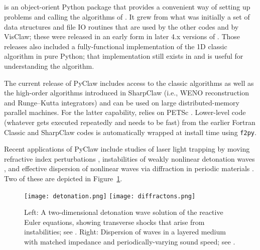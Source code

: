 %
%
%

\subsection{\pyclaw} \label{sec:pyclaw}
\pyclaw is an object-orient Python package that provides a convenient way
of setting up problems and calling the algorithms of \clawpack.  It grew
from what was initially a set of data structures and file IO routines that are
used by the other \clawpack codes and by VisClaw; these were released in
an early form in later 4.x versions of \clawpack.  Those releases also
included a fully-functional implementation of the 1D classic algorithm
in pure Python; that implementation still exists in \pyclaw and is useful
for understanding the algorithm.

The current release of PyClaw includes access to the classic algorithms as well
as the high-order algorithms introduced in SharpClaw \cite{2013_sharpclaw} (i.e., WENO
reconstruction and Runge--Kutta integrators) and can be used on large
distributed-memory parallel machines.  For the latter capability, \pyclaw
relies on PETSc \cite{petsc-user-ref}.
Lower-level code (whatever gets executed
repeatedly and needs to be fast) from the earlier Fortran Classic and SharpClaw
codes is automatically wrapped at install time using \texttt{f2py}.

Recent applications of PyClaw include studies of laser light trapping by moving
refractive index perturbations \cite{sanroman_thesis}, instabilities of weakly nonlinear detonation
waves \cite{faria2015qualitative}, and effective dispersion of nonlinear waves via diffraction in
periodic materials \cite{2015_diffractons}.  Two of these are depicted in 
Figure~\ref{fig:pyclaw-apps}.

\begin{figure}
\hfil\texttt{[image: detonation.png]}
\hskip 5pt
\hfil\texttt{[image: diffractons.png]}
\hskip 5pt
\caption{\label{fig:pyclaw-apps}
Left: A two-dimensional detonation wave solution of the reactive Euler equations,
showing transverse shocks that arise from instabilities; see \cite{faria2015qualitative}.
Right: Dispersion of waves in a layered medium with matched impedance and periodically-varying
sound speed; see \cite{2015_diffractons}.}
\end{figure}



